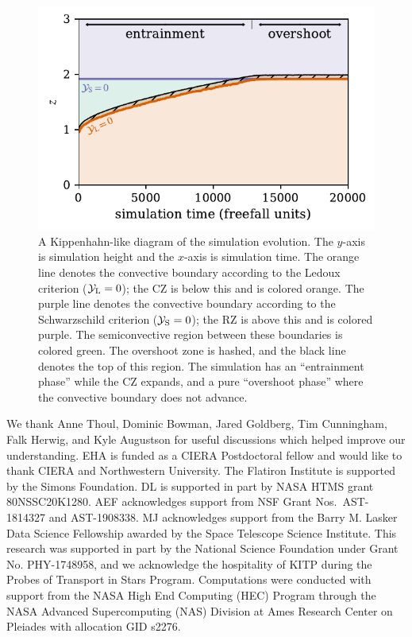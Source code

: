 \documentclass[twocolumn, linenumbers, twocolappendix]{aastex631}
\newcommand{\yL}{\ensuremath{\mathcal{Y}_{\rm{L}}}}
\newcommand{\yS}{\ensuremath{\mathcal{Y}_{\rm{S}}}}
\begin{document}
\begin{figure}[t!]
\centering
\includegraphics[width=\columnwidth]{kippenhahn.pdf}
\caption{
    A Kippenhahn-like diagram of the simulation evolution.
    The $y$-axis is simulation height and the $x$-axis is simulation time.
    The orange line denotes the convective boundary according to the Ledoux criterion ($\yL = 0$); the CZ is below this and is colored orange.
    The purple line denotes the convective boundary according to the Schwarzschild criterion ($\yS = 0$); the RZ is above this and is colored purple.
    The semiconvective region between these boundaries is colored green.
    The overshoot zone is hashed, and the black line denotes the top of this region.
    The simulation has an ``entrainment phase'' while the CZ expands, and a pure ``overshoot phase'' where the convective boundary does not advance.
\label{fig:kippenhahn}
}
\end{figure}




\begin{acknowledgments}
We thank Anne Thoul, Dominic Bowman, Jared Goldberg, Tim Cunningham, Falk Herwig, and Kyle Augustson for useful discussions which helped improve our understanding.
EHA is funded as a CIERA Postdoctoral fellow and would like to thank CIERA and Northwestern University. 
The Flatiron Institute is supported by the Simons Foundation.
DL is supported in part by NASA HTMS grant 80NSSC20K1280.
AEF acknowledges support from NSF Grant Nos.~AST-1814327 and AST-1908338. 
MJ acknowledges support from the Barry M. Lasker Data Science Fellowship awarded by the Space Telescope Science Institute.
This research was supported in part by the National Science Foundation under Grant No. PHY-1748958, and we acknowledge the hospitality of KITP during the Probes of Transport in Stars Program.
Computations were conducted with support from the NASA High End Computing (HEC) Program through the NASA Advanced Supercomputing (NAS) Division at Ames Research Center on Pleiades with allocation GID s2276.
\end{acknowledgments}

\newpage
\appendix





                                                          	



\end{document}
